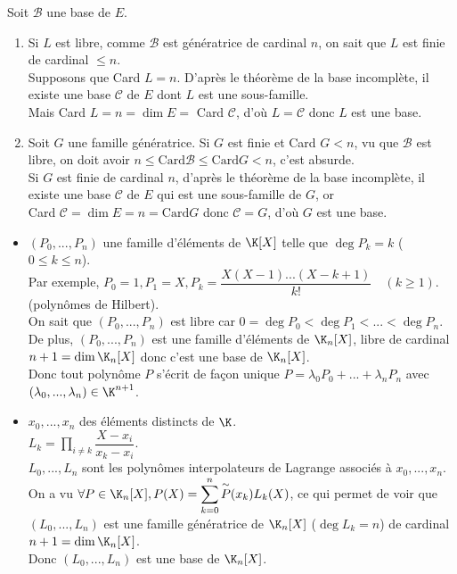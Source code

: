 \documentclass[12pt, a4paper]{report}
\begin{document}
\begin{demo}{}
Soit $\mathcal{B}$ une base de $E$. 
\begin{enumerate}
	\item Si $L$ est libre, comme $\mathcal{B}$ est génératrice de cardinal $n$, on sait que $L$ est finie de cardinal $\le n$. \\
	
	Supposons que Card $L = n$. D'après le théorème de la base incomplète, il existe une base $\mathcal{C}$ de $E$ dont $L$ est une sous-famille. \\
	Mais Card $L = n = \dim E = $ Card $\mathcal{C}$, d'où $L = \mathcal{C}$ donc $L$ est une base.
	
	\item Soit $G$ une famille génératrice. Si $G$ est finie et Card $G < n$, vu que $\mathcal{B}$ est libre, on doit avoir $n \le \text{Card} \mathcal{B} \le \text{Card} G < n$, c'est absurde. \\
	Si $G$ est finie de cardinal $n$, d'après le théorème de la base incomplète, il existe une base $\mathcal{C}$ de $E$ qui est une sous-famille de $G$, or \\
	Card $\mathcal{C} = \dim E = n = \text{Card} G$ donc $\mathcal{C} = G$, d'où $G$ est une base.
\end{enumerate}
\end{demo}

\begin{exemple}{}
\begin{itemize}
	\item $(P_0,...,P_n)$ une famille d'éléments de $\K[X]$ telle que $\deg P_k = k$ ($0 \le k \le n$). \\
	Par exemple, $P_0 = 1, P_1 = X, P_k = \dfrac{X(X-1)...(X-k+1)}{k!} \quad (k \ge 1)$. (polynômes de Hilbert). \\
	On sait que $(P_0,...,P_n)$ est libre car $0 = \deg P_0 < \deg P_1 < ... < \deg P_n$. \\
	De plus, $(P_0,...,P_n)$ est une famille d'éléments de $\K_n[X]$, libre de cardinal $n+1 = \dim \K_n[X]$ donc c'est une base de $\K_n[X]$. \\
	Donc tout polynôme $P$ s'écrit de façon unique $P=\lambda_0P_0+...+\lambda_nP_n$ avec $(\lambda_0,...,\lambda_n) \in \K^{n+1}$.
	
	\item $x_0,...,x_n$ des éléments distincts de $\K$. \\
	$L_k = \displaystyle{\prod_{i \ne k} \dfrac{X-x_i}{x_k-x_i}}$. \\
	$L_0,...,L_n$ sont les polynômes interpolateurs de Lagrange associés à $x_0,...,x_n$. \\
	On a vu $\forall P \in \K_n[X], P(X) = \displaystyle{\sum_{k=0}^n \overset{\sim}{P}(x_k)L_k(X)}$, ce qui permet de voir que $(L_0,...,L_n)$ est une famille génératrice de $\K_n[X]$ ($\deg L_k = n$) de cardinal $n+1 = \dim \K_n[X]$. \\
	Donc $(L_0,...,L_n)$ est une base de $\K_n[X]$.
\end{itemize}
\end{exemple}
\end{document}
